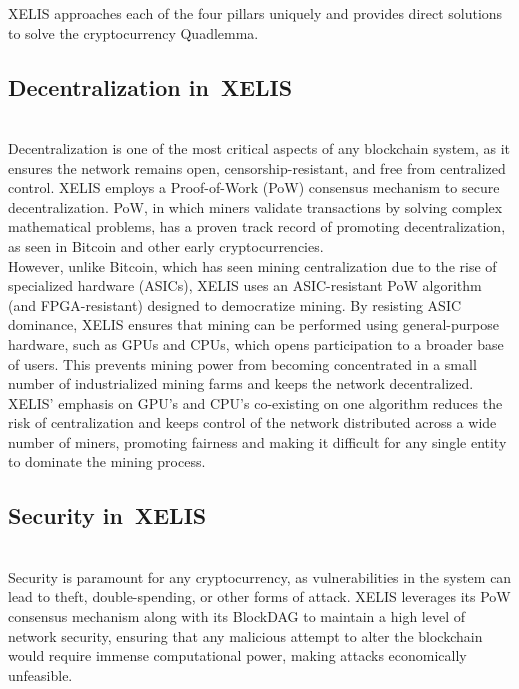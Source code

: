 \documentclass[12pt,a4paper,twocolumn]{article}
\begin{document}
XELIS approaches each of the four pillars uniquely and provides direct solutions to solve the cryptocurrency Quadlemma.\\


    \subsection{Decentralization in XELIS}\\

Decentralization is one of the most critical aspects of any blockchain system, as it ensures the network remains open, censorship-resistant, and free from centralized control. XELIS employs a Proof-of-Work (PoW) consensus mechanism to secure decentralization. PoW, in which miners validate transactions by solving complex mathematical problems, has a proven track record of promoting decentralization, as seen in Bitcoin and other early cryptocurrencies.\\

However, unlike Bitcoin, which has seen mining centralization due to the rise of specialized hardware (ASICs), XELIS uses an ASIC-resistant PoW algorithm (and FPGA-resistant) designed to democratize mining. By resisting ASIC dominance, XELIS ensures that mining can be performed using general-purpose hardware, such as GPUs and CPUs, which opens participation to a broader base of users. This prevents mining power from becoming concentrated in a small number of industrialized mining farms and keeps the network decentralized.\\

XELIS' emphasis on GPU's and CPU's co-existing on one algorithm reduces the risk of centralization and keeps control of the network distributed across a wide number of miners, promoting fairness and making it difficult for any single entity to dominate the mining process.\\

\subsection{Security in XELIS}\\

Security is paramount for any cryptocurrency, as vulnerabilities in the system can lead to theft, double-spending, or other forms of attack. XELIS leverages its PoW consensus mechanism along with its BlockDAG to maintain a high level of network security, ensuring that any malicious attempt to alter the blockchain would require immense computational power, making attacks economically unfeasible.\\
\end{document}
